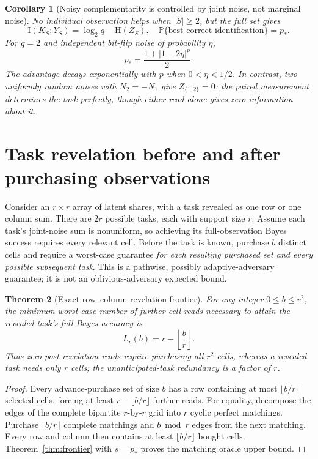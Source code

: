 \documentclass[11pt,letterpaper]{article}
\newtheorem{theorem}{Theorem}
\newtheorem{corollary}[theorem]{Corollary}
\newcommand{\Hh}{\mathrm H}
\newcommand{\II}{\mathrm I}
\newcommand{\Prb}{\mathbb P}
\begin{document}
\begin{corollary}[Noisy complementarity is controlled by joint noise, not marginal noise]\label{cor:noise}
No individual observation helps when \(|S|\ge2\), but the full set gives
\[\II(K_S;Y_S)=\log_2q-\Hh(Z_S),\quad
 \Prb\{\text{best correct identification}\}=p_*.\]
For \(q=2\) and independent bit-flip noise of probability \(\eta\),
\[p_* =\frac{1+|1-2\eta|^p}{2}.\]
The advantage decays exponentially with \(p\) when \(0<\eta<1/2\). In contrast, two uniformly random noises with \(N_2=-N_1\) give \(Z_{\{1,2\}}=0\): the paired measurement determines the task perfectly, though either read alone gives zero information about it.
\end{corollary}

\section{Task revelation before and after purchasing observations}
Consider an \(r\times r\) array of latent shares, with a task revealed as one row or one column sum. There are \(2r\) possible tasks, each with support size \(r\). Assume each task's joint-noise sum is nonuniform, so achieving its full-observation Bayes success requires every relevant cell. Before the task is known, purchase \(b\) distinct cells and require a worst-case guarantee \emph{for each resulting purchased set and every possible subsequent task}. This is a pathwise, possibly adaptive-adversary guarantee; it is not an oblivious-adversary expected bound.

\begin{theorem}[Exact row--column revelation frontier]\label{thm:grid}
For any integer \(0\le b\le r^2\), the minimum worst-case number of further cell reads necessary to attain the revealed task's full Bayes accuracy is
\begin{equation}\label{eq:grid}
L_r(b)=r-\left\lfloor\frac br\right\rfloor.
\end{equation}
Thus zero post-revelation reads require purchasing all \(r^2\) cells, whereas a revealed task needs only \(r\) cells; the unanticipated-task redundancy is a factor of \(r\).
\end{theorem}
\begin{proof}
Every advance-purchase set of size \(b\) has a row containing at most \(\lfloor b/r\rfloor\) selected cells, forcing at least \(r-\lfloor b/r\rfloor\) further reads. For equality, decompose the edges of the complete bipartite \(r\)-by-\(r\) grid into \(r\) cyclic perfect matchings. Purchase \(\lfloor b/r\rfloor\) complete matchings and \(b\bmod r\) edges from the next matching. Every row and column then contains at least \(\lfloor b/r\rfloor\) bought cells. Theorem~\ref{thm:frontier} with \(s=p_*\) proves the matching oracle upper bound.
\end{proof}
\end{document}
